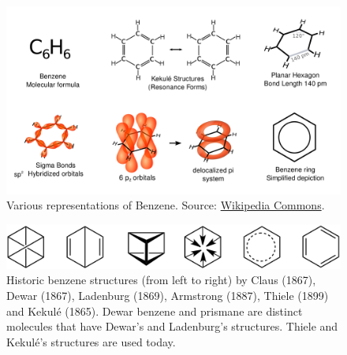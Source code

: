 \documentclass[
]{book}
\begin{document}
\begin{figure}

{\centering \includegraphics[width=1\linewidth]{Figures/Benzene_Representations} 

}

\caption{Various representations of Benzene. Source: \href{https://en.wikipedia.org/wiki/File:Benzene_Representations.svg}{Wikipedia Commons}.}\label{fig:benzene-model}
\end{figure}



\begin{figure}

{\centering \includegraphics[width=1\linewidth]{Figures/Historic_Benzene_Formulae} 

}

\caption{Historic benzene structures (from left to right) by Claus (1867), Dewar (1867), Ladenburg (1869), Armstrong (1887), Thiele (1899) and Kekulé (1865). Dewar benzene and prismane are distinct molecules that have Dewar's and Ladenburg's structures. Thiele and Kekulé's structures are used today.}\label{fig:benzene-model-evolution}
\end{figure}
\end{document}
